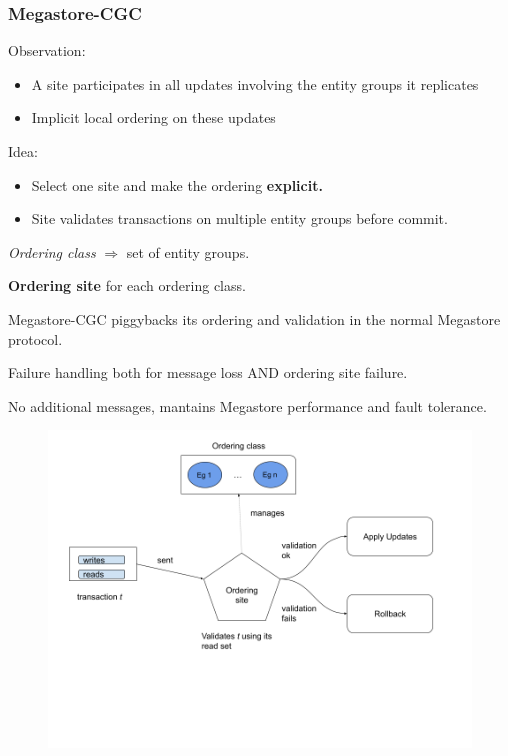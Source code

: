 \documentclass{beamer}
\begin{document}
\begin{frame}
\frametitle{Megastore-CGC}

    Observation:
    \begin{itemize}
        \item A site participates in all updates involving the entity groups it replicates 
        \item Implicit local ordering on these updates
    \end{itemize}  
            
    Idea:
    \begin{itemize}
        \item Select one site and make the ordering \textbf{explicit.}
        \item Site validates transactions on multiple entity groups before commit.
    \end{itemize}

    \emph{Ordering class} $\Rightarrow$ set of entity groups.

    \textbf{Ordering site} for each ordering class.
\end{frame}

\begin{frame}
    Megastore-CGC piggybacks its ordering and validation in the normal Megastore protocol.
    


    \bigskip
    Failure handling both for message loss AND ordering site failure.

    \bigskip
    No additional messages, mantains Megastore performance and fault tolerance. 

    \begin{figure}
        \includegraphics[width=\textwidth,height=\textheight,keepaspectratio]{img/validate.png}
    \end{figure}
\end{frame}
\end{document}
